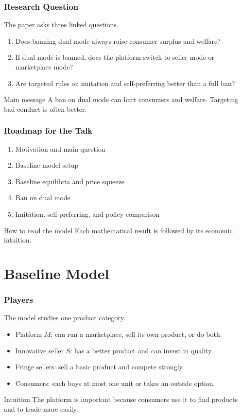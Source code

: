 \documentclass[aspectratio=169,AutoFakeBold,AutoFakeSlant]{beamer}
\begin{document}
\begin{frame}
  \frametitle{Research Question}
  \small
  The paper asks three linked questions.

  \begin{enumerate}
    \item Does banning dual mode always raise consumer surplus and welfare?
    \item If dual mode is banned, does the platform switch to seller mode or marketplace mode?
    \item Are targeted rules on imitation and self-preferring better than a full ban?
  \end{enumerate}

  \begin{block}{Main message}
    A ban on dual mode can hurt consumers and welfare. Targeting bad conduct is often better.
  \end{block}
\end{frame}

\begin{frame}
  \frametitle{Roadmap for the Talk}
  \small
  \begin{enumerate}
    \item Motivation and main question
    \item Baseline model setup
    \item Baseline equilibria and price squeeze
    \item Ban on dual mode
    \item Imitation, self-preferring, and policy comparison
  \end{enumerate}

  \begin{block}{How to read the model}
    Each mathematical result is followed by its economic intuition.
  \end{block}
\end{frame}

\section{Baseline Model}

\begin{frame}
  \frametitle{Players}
  \small
  The model studies one product category.

  \begin{itemize}
    \item Platform $M$: can run a marketplace, sell its own product, or do both.
    \item Innovative seller $S$: has a better product and can invest in quality.
    \item Fringe sellers: sell a basic product and compete strongly.
    \item Consumers: each buys at most one unit or takes an outside option.
  \end{itemize}

  \begin{block}{Intuition}
    The platform is important because consumers use it to find products and to trade more easily.
  \end{block}
\end{frame}
\end{document}
